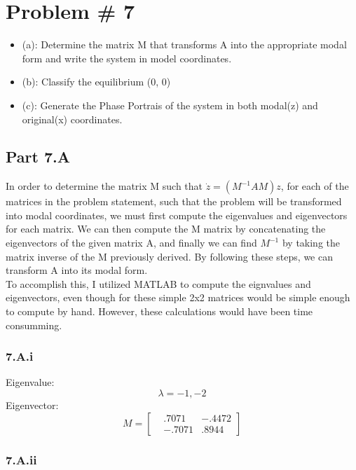 
\section*{Problem \# 7}

\begin{itemize}
    \item (a): Determine the matrix M that transforms A into the appropriate modal form and write the system in model coordinates.
    \item (b): Classify the equilibrium (0, 0)
    \item (c): Generate the Phase Portrais of the system in both modal(z) and original(x) coordinates.

\end{itemize}

\subsection*{Part 7.A}
In order to determine the matrix M such that $\dot{z} = \left(M^{-1}AM \right)z$, for each of the matrices in the problem statement, such that the problem will be transformed into modal coordinates, we must first compute the eigenvalues and eigenvectors for each matrix. We can then compute the M matrix by concatenating the eigenvectors of the given matrix A, and finally we can find $M^{-1}$ by taking the matrix inverse of the M previously derived. By following these steps, we can transform A into its modal form. \\

To accomplish this, I utilized MATLAB to compute the eignvalues and eigenvectors, even though for these simple 2x2 matrices would be simple enough to compute by hand. However, these calculations would have been time consumming.

\subsubsection*{7.A.i}

Eigenvalue:
$$ \lambda = -1, -2 $$
Eigenvector:
$$M =
\begin{bmatrix}
    & .7071 & -.4472 \\
    & -.7071 & .8944
\end{bmatrix}
$$


\subsubsection*{7.A.ii}

